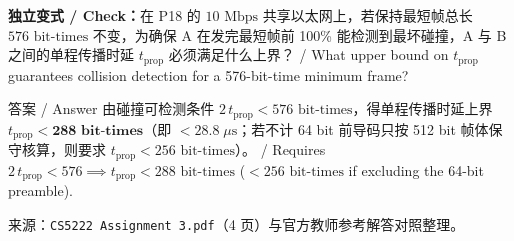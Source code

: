 \textbf{独立变式 / Check：}在 P18 的 $10\text{ Mbps}$ 共享以太网上，若保持最短帧总长 $576\text{ bit-times}$ 不变，为确保 A 在发完最短帧前 100\% 能检测到最坏碰撞，A 与 B 之间的单程传播时延 $t_{\mathrm{prop}}$ 必须满足什么上界？ / What upper bound on $t_{\mathrm{prop}}$ guarantees collision detection for a 576-bit-time minimum frame?

\begin{StudySolution}{答案 / Answer}
由碰撞可检测条件 $2\,t_{\mathrm{prop}} < 576\text{ bit-times}$，得单程传播时延上界 $t_{\mathrm{prop}} < \mathbf{288\text{ bit-times}}$（即 $< 28.8\;\mu\text{s}$；若不计 64 bit 前导码只按 512 bit 帧体保守核算，则要求 $t_{\mathrm{prop}} < 256\text{ bit-times}$）。 / Requires $2\,t_{\mathrm{prop}} < 576 \implies t_{\mathrm{prop}} < 288\text{ bit-times}$ ($< 256\text{ bit-times}$ if excluding the 64-bit preamble).
\end{StudySolution}

来源：\texttt{CS5222 Assignment 3.pdf}（4 页）与官方教师参考解答对照整理。
